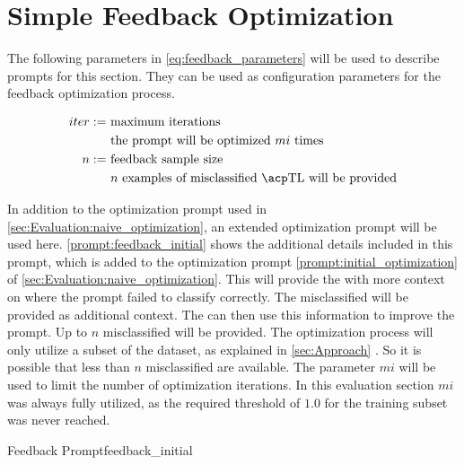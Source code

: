 \newpage


\section{Simple Feedback Optimization}
\label{sec:Evaluation:simple_feedback_optimization}

The following parameters in \autoref{eq:feedback_parameters} will be used to describe prompts for this section.
They can be used as configuration parameters for the feedback optimization process.

\begin{equation}
    \label{eq:feedback_parameters}
    \begin{aligned}
        iter := & \ \text{maximum iterations} \\
        & \ \text{the prompt will be optimized $mi$ times} \\
        n :=    & \ \text{feedback sample size} \\
        & \ \text{$n$ examples of misclassified \TLs will be provided}
    \end{aligned}
\end{equation}

In addition to the optimization prompt used in \autoref{sec:Evaluation:naive_optimization}, an extended optimization prompt will be used here.
\autoref{prompt:feedback_initial} shows the additional details included in this prompt, which is added to the optimization prompt \autoref{prompt:initial_optimization} of \autoref{sec:Evaluation:naive_optimization}.
This will provide the \LLM with more context on where the prompt failed to classify correctly.
The misclassified \TLs will be provided as additional context.
The \LLM can then use this information to improve the prompt.
Up to $n$ misclassified \TLs will be provided.
The optimization process will only utilize a subset of the dataset, as explained in \autoref{sec:Approach} .
So it is possible that less than $n$ misclassified \TLs are available.
The parameter $mi$ will be used to limit the number of optimization iterations.
In this evaluation section $mi$ was always fully utilized, as the required \fone threshold of $1.0$ for the training subset was never reached.

\begin{prompt}{Feedback Prompt}{feedback_initial}
    \\
    
\end{prompt}

